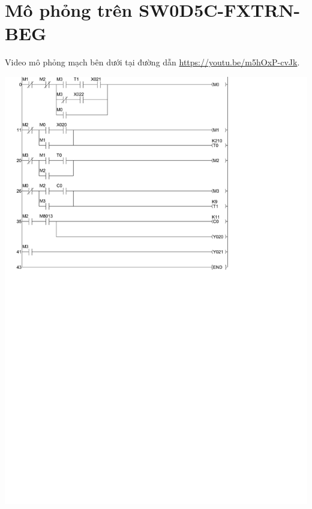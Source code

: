 \documentclass[12pt,a4paper]{article}
\begin{document}
\section{Mô phỏng trên SW0D5C-FXTRN-BEG}
Video mô phỏng mạch bên dưới tại đường dẫn \url{https://youtu.be/m5hOxP-cvJk}.
\begin{center}
    \includegraphics{simulation.pdf}
\end{center}
\end{document}
